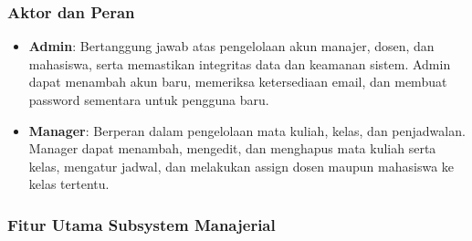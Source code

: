 \documentclass[a4paper,oneside,11pt]{book}
\begin{document}
\subsubsection{Aktor dan Peran}

\begin{itemize}
  \item \textbf{Admin}: Bertanggung jawab atas pengelolaan akun manajer, dosen, dan mahasiswa, serta memastikan integritas data dan keamanan sistem. Admin dapat menambah akun baru, memeriksa ketersediaan email, dan membuat password sementara untuk pengguna baru.
  \item \textbf{Manager}: Berperan dalam pengelolaan mata kuliah, kelas, dan penjadwalan. Manager dapat menambah, mengedit, dan menghapus mata kuliah serta kelas, mengatur jadwal, dan melakukan assign dosen maupun mahasiswa ke kelas tertentu.
\end{itemize}

\subsubsection{Fitur Utama Subsystem Manajerial}
\end{document}
